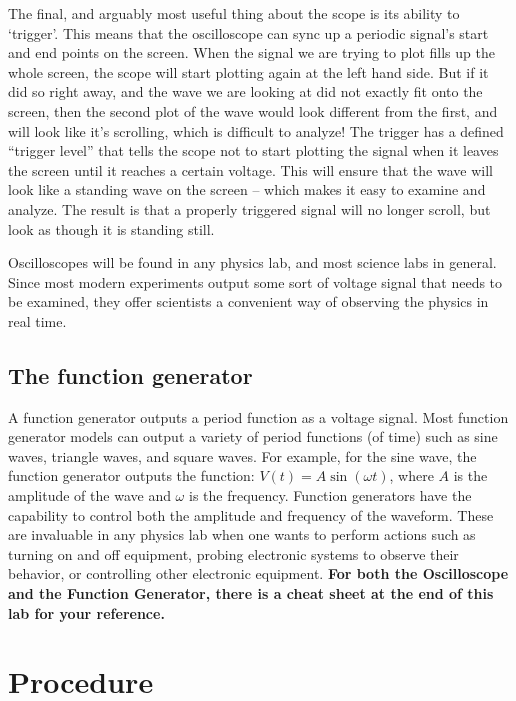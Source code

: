 The final, and arguably most useful thing about the scope is its ability to `trigger'. This means that the oscilloscope can sync up a periodic signal's start and end points on the screen. When the signal we are trying to plot fills up the whole screen, the scope will start plotting again at the left hand side. But if it did so right away, and the wave we are looking at did not exactly fit onto the screen, then the second plot of the wave would look different from the first, and will look like it's scrolling, which is difficult to analyze! The trigger has a defined ``trigger level'' that tells the scope not to start plotting the signal when it leaves the screen until it reaches a certain voltage. This will ensure that the wave will look like a standing wave on the screen -- which makes it easy to examine and analyze. The result is that a properly triggered signal will no longer scroll, but look as though it is standing still. \myskip

Oscilloscopes will be found in any physics lab, and most science labs in general. Since most modern experiments output some sort of voltage signal that needs to be examined, they offer scientists a convenient way of observing the physics in real time.

\subsection{The function generator}

A function generator outputs a period function as a voltage signal. Most function generator models can output a variety of period functions (of time) such as sine waves, triangle waves, and square waves. For example, for the sine wave, the function generator outputs the function: $V(t) = A \sin(\omega t)$, where $A$ is the amplitude of the wave and $\omega$ is the frequency. Function generators have the capability to control both the amplitude and frequency of the waveform. These are invaluable in any physics lab when one wants to perform actions such as turning on and off equipment, probing electronic systems to observe their behavior,  or controlling other electronic equipment.
\vspace{5mm}
\newline
\textbf{For both the Oscilloscope and the Function Generator, there is a cheat sheet at the end of this lab for your reference.}

\section{Procedure}

